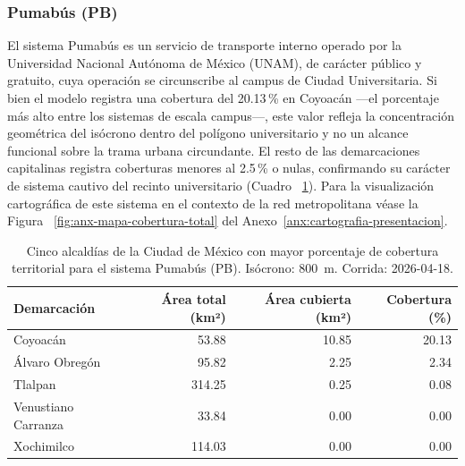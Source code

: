\subsubsection{Pumabús (PB)}
\label{subsubsec:cobertura-pb}

El sistema Pumabús es un servicio de transporte interno operado por la
Universidad Nacional Autónoma de México (UNAM), de carácter público y gratuito,
cuya operación se circunscribe al campus de Ciudad Universitaria. Si bien el
modelo registra una cobertura del 20.13\,\% en Coyoacán ---el porcentaje más
alto entre los sistemas de escala campus---, este valor refleja la concentración
geométrica del isócrono dentro del polígono universitario y no un alcance
funcional sobre la trama urbana circundante. El resto de las demarcaciones
capitalinas registra coberturas menores al 2.5\,\% o nulas, confirmando su
carácter de sistema cautivo del recinto universitario (Cuadro~
\ref{tab:cobertura-pb-cdmx}). Para la visualización cartográfica de este sistema
en el contexto de la red metropolitana véase la Figura~
\ref{fig:anx-mapa-cobertura-total} del Anexo~\ref{anx:cartografia-presentacion}.

\begin{table}[H]
    \centering
    \caption[Alcaldías con mayor cobertura de Pumabús (CDMX)]{
    Cinco alcaldías de la Ciudad de México con mayor porcentaje de cobertura
    territorial para el sistema Pumabús (PB). Isócrono: 800~m.
    Corrida: 2026-04-18.}
    \label{tab:cobertura-pb-cdmx}
    \begin{tabular}{|l|r|r|r|}
        \hline
        \textbf{Demarcación} & \textbf{Área total (km²)} & \textbf{Área cubierta (km²)} & \textbf{Cobertura (\%)} \\
        \hline
        Coyoacán            &  53.88 & 10.85 &  20.13 \\
        Álvaro Obregón      &  95.82 &  2.25 &   2.34 \\
        Tlalpan             & 314.25 &  0.25 &   0.08 \\
        Venustiano Carranza &  33.84 &  0.00 &   0.00 \\
        Xochimilco          & 114.03 &  0.00 &   0.00 \\
        \hline
    \end{tabular}
\end{table}


